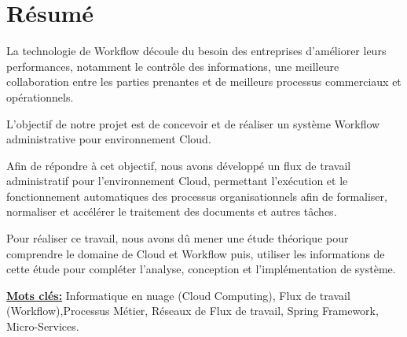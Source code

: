 \chapter*{Résumé}

\large

La technologie de Workflow découle du besoin des entreprises d’améliorer leurs performances, notamment le contrôle des informations, une meilleure collaboration entre les parties prenantes et de meilleurs processus commerciaux et opérationnels.

L'objectif de notre projet est de concevoir et de réaliser un système Workflow administrative  pour environnement Cloud.
 

Afin de répondre à cet objectif,  nous avons développé un flux de travail administratif pour l'environnement Cloud, permettant l'exécution et le fonctionnement automatiques des processus organisationnels afin de formaliser, normaliser et accélérer le traitement des documents et autres tâches.

Pour réaliser ce travail, nous avons dû mener une étude théorique pour comprendre le domaine de Cloud  et Workflow  puis, utiliser les informations de cette étude pour compléter l'analyse, conception et l'implémentation de système.



\textbf{\underline{Mots clés:}}    Informatique en nuage (Cloud Computing), Flux de travail (Workflow),Processus Métier, Réseaux de Flux de travail, Spring Framework, Micro-Services. 


\normalsize

